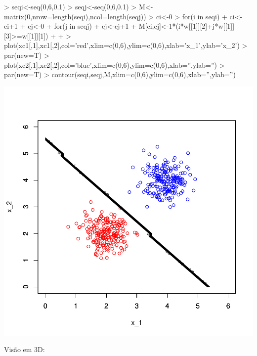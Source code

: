 \documentclass{article}
\begin{document}
\begin{Schunk}
\begin{Sinput}
>   seqi<-seq(0,6,0.1)
>   seqj<-seq(0,6,0.1)
>   M<-matrix(0,nrow=length(seqi),ncol=length(seqj))
>   ci<-0
>   for(i in seqi) {
+     ci<-ci+1
+     cj<-0
+     for(j in seqj) {
+       cj<-cj+1
+       M[ci,cj]<-1*(i*w[[1]][2]+j*w[[1]][3]>=w[[1]][1])
+     }
+   }
>   plot(xc1[,1],xc1[,2],col='red',xlim=c(0,6),ylim=c(0,6),xlab='x_1',ylab='x_2')
>   par(new=T)
>   plot(xc2[,1],xc2[,2],col='blue',xlim=c(0,6),ylim=c(0,6),xlab='',ylab='')
>   par(new=T)
>   contour(seqi,seqj,M,xlim=c(0,6),ylim=c(0,6),xlab='',ylab='')
\end{Sinput}
\end{Schunk}
\includegraphics{train_perceptron-003}

Visão em 3D:
\end{document}
